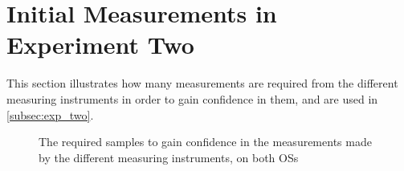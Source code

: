 \section{Initial Measurements in Experiment Two}\label{app:exp_two_coch}

This section illustrates how many measurements are required from the different measuring instruments in order to gain confidence in them, and are used in \cref{subsec:exp_two}.

% 
% 

\begin{figure}[H]
    \centering
    \begin{subfigure}[b]{0.4\textwidth}
        \centering
        
    \end{subfigure}
    \hfill
    \begin{subfigure}[b]{0.4\textwidth}
        \centering
        
    \end{subfigure}
    \caption{The required samples to gain confidence in the measurements made by the different measuring instruments, on both OSs}
\end{figure}
